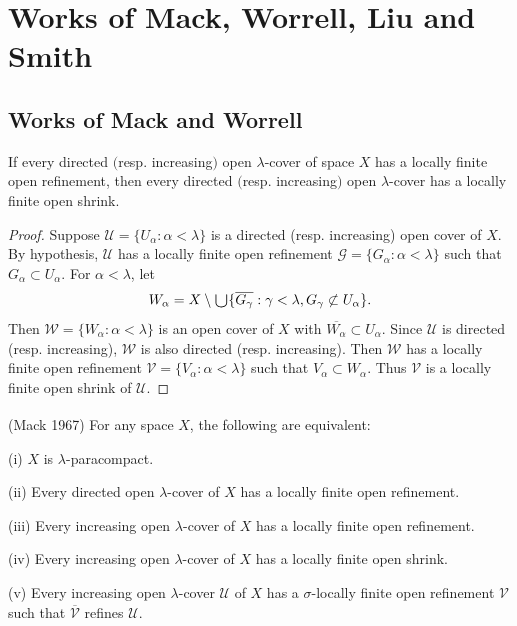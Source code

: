 \documentclass[main.tex]{subfiles}
\begin{document}
	
\chapter{Works of Mack, Worrell, Liu and Smith} 
	\label{ch3}

\section{Works of Mack and Worrell}\label{sec:3.1}

{\lemma{} \label{lem:3.1.1} 
If every directed $($resp. increasing$)$ open $\lambda$-cover of space $X$ has a locally finite 
open refinement, then every directed $($resp. increasing$)$ open $\lambda$-cover has a 
locally finite open shrink.
}
\begin{proof}
Suppose $\mathscr{U} = \{U_\alpha: \alpha < \lambda\}$ is a directed (resp. increasing) 
open cover of $X$. By hypothesis, $\mathscr{U}$ has a locally finite open 
refinement $\mathscr{G} = \{G_\alpha: \alpha < \lambda\}$ such that 
$G_\alpha \subset U_\alpha$. 
For $\alpha < \lambda$, let
$$W_\alpha = X \setminus \raisebox{-2pt}{\scalebox{1.5}{$\cup$}} \{ \overline{G_\gamma}: \gamma < \lambda,  
G_\gamma \not\subset U_\alpha\}.$$
Then $\mathscr{W} = \{W_\alpha: \alpha < \lambda\}$ is an open cover of $X$ 
with $\overline{W_\alpha} \subset U_\alpha$. 
Since $\mathscr{U}$ is directed (resp. increasing), $\mathscr{W}$ is also 
directed (resp. increasing). Then $\mathscr{W}$ has a locally finite open refinement 
$\mathscr{V} = \{V_\alpha: \alpha < \lambda\}$  such that $V_\alpha \subset W_\alpha$. 
Thus $\mathscr{V}$ is a locally finite open shrink of $\mathscr{U}$. 
\end{proof} 

{\theorem{} \label{th:3.1.2} 
\textup{(\hstretch{1.8}{[}Mack 1967\hstretch{1.8}{]}\textsuperscript{\cite{Mack}})} For any space $X$, 
the following are equivalent:

\textup{(i)} $X$ is $\lambda$-paracompact.

\textup{(ii)} Every directed open $\lambda$-cover of $X$ has a  locally finite open refinement.

\textup{(iii)} Every increasing open $\lambda$-cover of $X$ has a  locally finite open refinement.

\textup{(iv)}  Every increasing open $\lambda$-cover of $X$ has a locally finite open shrink.

\textup{(v)}  Every increasing open $\lambda$-cover $\mathscr{U}$ of $X$
has a $\sigma$-locally finite open refinement $\mathscr{V}$ such that 
$\overline{\mathscr{V}}$ refines $\mathscr{U}$.
}
\end{document}
